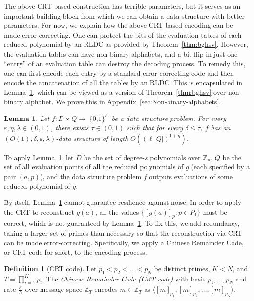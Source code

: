 \documentclass[11pt,english]{article}
\newtheorem{lem}[theorem]{Lemma}
\theoremstyle{definition}
\newtheorem{defn}{Definition}
\theoremstyle{remark}
\newcommand{\eps}{\varepsilon}
\newcommand{\cube}{\operatorname{\{0, 1\}}}
\newcommand{\Z}{\mathbb{Z}}
\begin{document}
The above CRT-based construction has terrible parameters, but it serves
as an important building block from which we can obtain a data structure
with better parameters. For now, we explain how the above CRT-based
encoding can be made error-correcting. One can protect the bits of
the evaluation tables of each reduced polynomial by an RLDC as provided
by Theorem~\ref{thm:bghsv}. However, the evaluation tables can have
non-binary alphabets, and a bit-flip in just one ``entry'' of
an evaluation table can destroy the decoding process. To remedy this,
one can first encode each entry by a standard error-correcting code
and then encode the concatenation of all the tables by an RLDC. This
is encapsulated in Lemma~\ref{lem:non-binary RLDC}, which can be
viewed as a version of Theorem~\ref{thm:bghsv} over non-binary alphabet.
We prove this in Appendix~\ref{sec:Non-binary-alphabets}. 

\begin{lem}\label{lem:non-binary RLDC} Let $f:{D}\times Q\rightarrow\cube^{\ell}$
be a data structure problem. For every $\eps,\eta,\lambda\in(0,1)$,
there exists $\tau\in(0,1)$ such that for every
$\delta\leq\tau$, $f$ has an $(O(1),\delta,\eps,\lambda)$-data
structure of length $O(\left(\ell|Q|\right)^{1+\eta})$. \end{lem}

To apply Lemma~\ref{lem:non-binary RLDC}, let $D$ be the
set of degree-$s$ polynomials over $\Z_{n}$, $Q$ be the set
of all evaluation points of all the reduced polynomials of $g$ (each specified by a pair $(a,p)$), and
the data structure problem $f$ outputs evaluations of some reduced
polynomial of $g$. 

By itself, Lemma~\ref{lem:non-binary RLDC} cannot guarantee resilience
against noise. In order to apply the CRT to reconstruct $g(a)$, all
the values $\{[g(a)]_{p}:p\in P_{1}\}$ must be correct, which is
not guaranteed by Lemma~\ref{lem:non-binary RLDC}. To fix this,
we add redundancy, taking a larger set of primes than necessary so that the reconstruction
via CRT can be made error-correcting. Specifically, we apply a Chinese
Remainder Code, or CRT code for short, to the encoding process. 

\begin{defn}[CRT code]\label{def:crtcode}Let $p_{1}<p_{2}<\ldots<p_{N}$
be distinct primes, $K<N$, and $T=\prod\limits _{i=1}^{K}p_{i}$.
The \emph{Chinese Remainder Code (CRT code)} with basis $p_{1},\ldots,p_{N}$
and rate $\frac{K}{N}$ over message space $\Z_{T}$ encodes $m\in\Z_{T}$ 
as $\langle[m]_{p_{1}},[m]_{p_{2}},\ldots,[m]_{p_{N}}\rangle$.
\end{defn}
\end{document}
